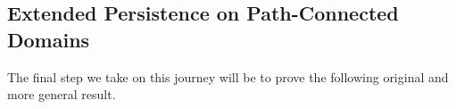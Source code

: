 














\subsection{Extended Persistence on Path-Connected Domains}

The final step we take on this journey will be to prove the following original and more general result.

